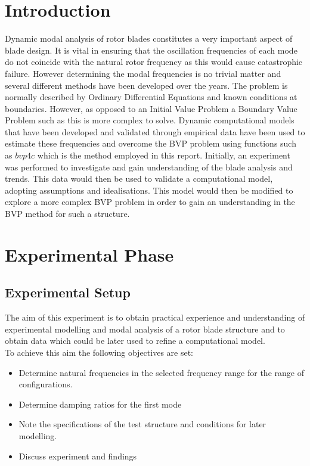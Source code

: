 \documentclass[11pt]{article}
\begin{document}
\section{Introduction}
Dynamic modal analysis of rotor blades constitutes a very important aspect of blade design. It is vital in ensuring that the oscillation frequencies of each mode do not coincide with the natural rotor frequency as this would cause catastrophic failure. However determining the modal frequencies is no trivial matter and several different methods have been developed over the years. The problem is normally described by Ordinary Differential Equations and known conditions at boundaries. However, as opposed to an Initial Value Problem a Boundary Value Problem such as this is more complex to solve. Dynamic computational models that have been developed and validated through empirical data have been used to estimate these frequencies and overcome the BVP problem using functions such as $bvp4c$ which is the method employed in this report. Initially, an experiment was performed to investigate and gain understanding of the blade analysis and trends. This data would then be used to validate a computational model, adopting assumptions and idealisations. This model would then be modified to explore a more complex BVP problem in order to gain an understanding in the BVP method for such a structure.
\section{Experimental Phase}
\subsection{Experimental Setup}
The aim of this experiment is to obtain practical experience and understanding of experimental modelling and modal analysis of a rotor blade structure and to obtain data which could be later used to refine a computational model.\\
To achieve this aim the following objectives are set:
\begin{itemize}
\itemsep0em
    \item Determine natural frequencies in the selected frequency range for the range of configurations.
    \item Determine damping ratios for the first mode 
    \item Note the specifications of the test structure and conditions for later modelling.
    \item Discuss experiment and findings
\end{itemize}{}
\end{document}
